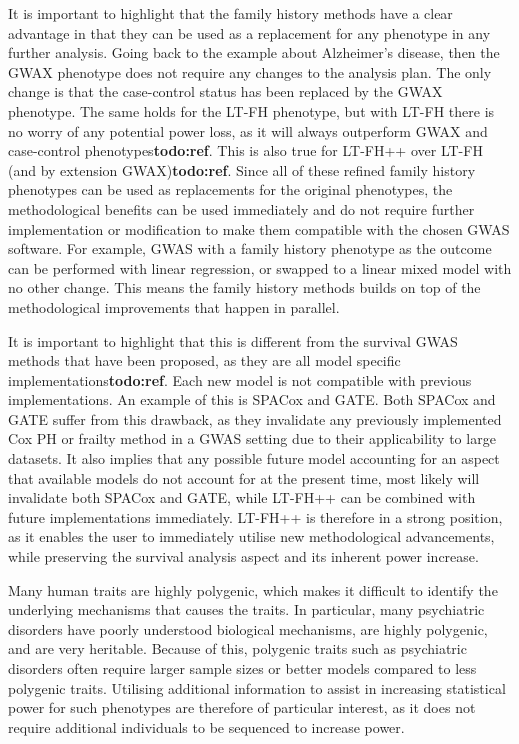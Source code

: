It is important to highlight that the family history methods have a clear advantage in that they can be used as a replacement for any phenotype in any further analysis. Going back to the example about Alzheimer's disease, then the GWAX phenotype does not require any changes to the analysis plan. The only change is that the case-control status has been replaced by the GWAX phenotype. The same holds for the LT-FH phenotype, but with LT-FH there is no worry of any potential power loss, as it will always outperform GWAX and case-control phenotypes\textbf{todo:ref}. This is also true for LT-FH++ over LT-FH (and by extension GWAX)\textbf{todo:ref}. Since all of these refined family history phenotypes can be used as replacements for the original phenotypes, the methodological benefits can be used immediately and do not require further implementation or modification to make them compatible with the chosen GWAS software. For example, GWAS with a family history phenotype as the outcome can be performed with linear regression, or swapped to a linear mixed model with no other change. This means the family history methods builds on top of the methodological improvements that happen in parallel.

It is important to highlight that this is different from the survival GWAS methods that have been proposed, as they are all model specific implementations\textbf{todo:ref}. Each new model is not compatible with previous implementations. An example of this is SPACox and GATE. Both SPACox and GATE suffer from this drawback, as they invalidate any previously implemented Cox PH or frailty method in a GWAS setting due to their applicability to large datasets. It also implies that any possible future model accounting for an aspect that available models do not account for at the present time, most likely will invalidate both SPACox and GATE, while LT-FH++ can be combined with future implementations immediately. LT-FH++ is therefore in a strong position, as it enables the user to immediately utilise new methodological advancements, while preserving the survival analysis aspect and its inherent power increase.    

Many human traits are highly polygenic, which makes it difficult to identify the underlying mechanisms that causes the traits\cite{song2021selection}. In particular, many psychiatric disorders have poorly understood biological mechanisms, are highly polygenic, and are very heritable\cite{pardinas2018common,esteller2020genomic}. Because of this, polygenic traits such as psychiatric disorders often require larger sample sizes or better models compared to less polygenic traits\cite{han2008genome,bergen2012genome,badano2002beyond}. Utilising additional information to assist in increasing statistical power for such phenotypes are therefore of particular interest, as it does not require additional individuals to be sequenced to increase power.



